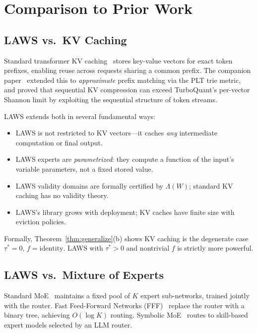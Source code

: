 \documentclass[11pt]{article}
\begin{document}
\section{Comparison to Prior Work}
\label{sec:related}

\subsection{LAWS vs.\ KV Caching}

Standard transformer KV caching~\cite{pope2023,kwon2023vllm} stores key-value
vectors for exact token prefixes, enabling reuse across requests sharing a
common prefix.  The companion paper~\cite{kv2026} extended this to
\emph{approximate} prefix matching via the PLT trie metric, and proved that
sequential KV compression can exceed TurboQuant's per-vector Shannon
limit by exploiting the sequential structure of token streams.

LAWS extends both in several fundamental ways:
\begin{itemize}[leftmargin=2em]
  \item LAWS is not restricted to KV vectors---it caches \emph{any}
        intermediate computation or final output.
  \item LAWS experts are \emph{parametrized}: they compute a function of
        the input's variable parameters, not a fixed stored value.
  \item LAWS validity domains are formally certified by $\Lambda(W)$; standard
        KV caching has no validity theory.
  \item LAWS's library grows with deployment; KV caches have finite size with
        eviction policies.
\end{itemize}

Formally, Theorem~\ref{thm:generalize}(b) shows KV caching is the degenerate
case $\tau^* = 0$, $f = \mathrm{identity}$.  LAWS with $\tau^* > 0$ and
nontrivial $f$ is strictly more powerful.

\subsection{LAWS vs.\ Mixture of Experts}

Standard MoE~\cite{shazeer2017,jiang2024mixtral,deepseek2024} maintains a fixed
pool of $K$ expert sub-networks, trained jointly with the router.  Fast
Feed-Forward Networks (FFF)~\cite{belcak2023fff} replace the router with a
binary tree, achieving $O(\log K)$ routing.  Symbolic MoE~\cite{symbolic_moe2025}
routes to skill-based expert models selected by an LLM router.
\end{document}
